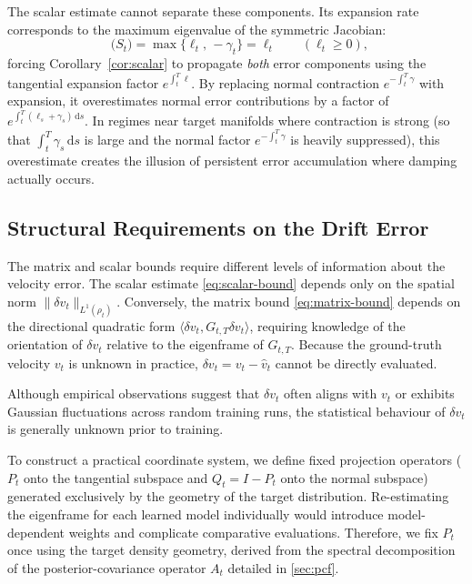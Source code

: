 \documentclass{article}
\newcommand{\dd}{\,\mathrm{d}}
\DeclareMathOperator{\lammax}{\lambda_{\max}}
\theoremstyle{plain}
\theoremstyle{definition}
\theoremstyle{remark}
\begin{document}
The scalar estimate cannot separate these components. Its expansion rate corresponds to the maximum eigenvalue of the symmetric Jacobian:
\begin{equation}
  \lammax\big(S_t\big) = \max\{\ell_t, \, -\gamma_t\} = \ell_t
  \qquad (\ell_t \ge 0),
  \label{eq:block-scalar-rate}
\end{equation}
forcing Corollary~\ref{cor:scalar} to propagate \emph{both} error components using the tangential expansion factor $e^{\int_t^T \ell}$. By replacing normal contraction $e^{-\int_t^T \gamma}$ with expansion, it overestimates normal error contributions by a factor of $e^{\int_t^T (\ell_s + \gamma_s) \dd s}$. In regimes near target manifolds where contraction is strong (so that $\int_t^T \gamma_s \dd s$ is large and the normal factor $e^{-\int_t^T \gamma}$ is heavily suppressed), this overestimate creates the illusion of persistent error accumulation where damping actually occurs.

\subsection{Structural Requirements on the Drift Error}
\label{subsec:direction}

The matrix and scalar bounds require different levels of information about the velocity error. The scalar estimate \eqref{eq:scalar-bound} depends only on the spatial norm $\|\delta v_t\|_{L^1(\rho_t)}$. Conversely, the matrix bound \eqref{eq:matrix-bound} depends on the directional quadratic form $\langle \delta v_t, G_{t,T} \delta v_t \rangle$, requiring knowledge of the orientation of $\delta v_t$ relative to the eigenframe of $G_{t,T}$. Because the ground-truth velocity $v_t$ is unknown in practice, $\delta v_t = v_t - \hat{v}_t$ cannot be directly evaluated.

Although empirical observations suggest that $\delta v_t$ often aligns with $v_t$ or exhibits Gaussian fluctuations across random training runs, the statistical behaviour of $\delta v_t$ is generally unknown prior to training.

To construct a practical coordinate system, we define fixed projection operators ($P_t$ onto the tangential subspace and $Q_t = I - P_t$ onto the normal subspace) generated exclusively by the geometry of the target distribution. Re-estimating the eigenframe for each learned model individually would introduce model-dependent weights and complicate comparative evaluations. Therefore, we fix $P_t$ once using the target density geometry, derived from the spectral decomposition of the posterior-covariance operator $A_t$ detailed in \autoref{sec:pcf}.
\end{document}
